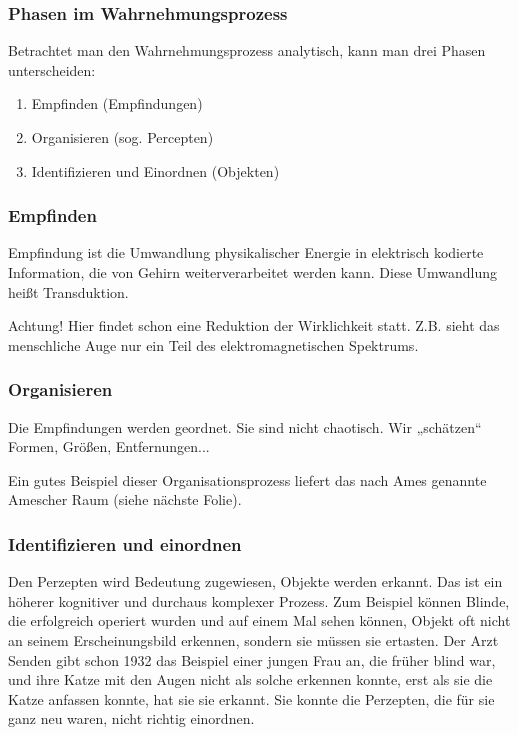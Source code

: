 \subsubsection{Phasen im Wahrnehmungsprozess}
Betrachtet man den Wahrnehmungsprozess analytisch, kann man drei Phasen unterscheiden:
\begin{enumerate}
\item Empfinden (Empfindungen)
\item Organisieren (sog. Percepten)
\item Identifizieren und Einordnen (Objekten)
\end{enumerate}

\subsubsection*{Empfinden}
Empfindung ist die Umwandlung physikalischer Energie in elektrisch kodierte Information, die von Gehirn weiterverarbeitet werden kann. Diese Umwandlung heißt Transduktion.

Achtung! Hier findet schon eine Reduktion der Wirklichkeit statt. Z.B. sieht das menschliche Auge nur ein Teil des elektromagnetischen Spektrums.

\subsubsection*{Organisieren}
Die Empfindungen werden geordnet. Sie sind nicht chaotisch. Wir „schätzen“ Formen, Größen, Entfernungen...

Ein gutes Beispiel dieser Organisationsprozess liefert das nach Ames genannte  Amescher Raum (siehe nächste Folie).

\subsubsection*{Identifizieren und einordnen}
Den Perzepten wird Bedeutung zugewiesen, Objekte werden erkannt. Das ist ein höherer kognitiver und durchaus komplexer Prozess. Zum Beispiel können Blinde, die erfolgreich operiert wurden und auf einem Mal sehen können, Objekt oft nicht an seinem Erscheinungsbild erkennen, sondern sie müssen sie ertasten. Der Arzt Senden gibt  schon 1932 das Beispiel einer jungen Frau an, die früher blind war, und ihre Katze mit den Augen nicht als solche erkennen konnte, erst als sie die Katze anfassen konnte, hat sie sie erkannt. Sie konnte die Perzepten, die für sie ganz neu waren, nicht richtig einordnen.
 
